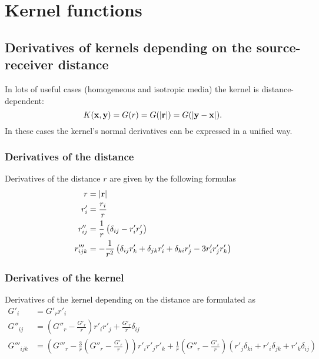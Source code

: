 \chapter{Kernel functions}

\section{Derivatives of kernels depending on the source-receiver distance}

In lots of useful cases (homogeneous and isotropic media) the kernel is distance-dependent:
%
\begin{equation}
K({\bf x}, {\bf y}) = G(r) = G(|{\bf r}|) = G(|{\bf y} - {\bf x}|).
\end{equation}
%
In these cases the kernel's normal derivatives can be expressed in a unified way.

\subsection{Derivatives of the distance}

Derivatives of the distance $r$ are given by the following formulas
%
\begin{align}
	r &= |{\bf r}| \\
	r'_i &= \frac{r_i}{r} \\
	r''_{ij} &= \frac{1}{r} \left( \delta_{ij} - r'_i r'_j \right) \\
	r'''_{ijk} &= -\frac{1}{r^2} \left(
		\delta_{ij} r'_k + \delta_{jk} r'_i + \delta_{ki} r'_j - 3 r'_i r'_j r'_k
	\right)
\end{align}

\subsection{Derivatives of the kernel}

Derivatives of the kernel depending on the distance are formulated as
%
\begin{align}
	G'_i &= G'_r r'_i \\
	G''_{ij} &= \left(G''_r - \frac{G'_r}{r} \right) r'_i r'_j +  \frac{G'_r}{r} \delta_{ij} \\
	G'''_{ijk} &=
	\left(G'''_r -\frac{3}{r} \left(G''_r  - \frac{G'_r}{r} \right) \right) r'_i r'_j r'_k
	+  \frac{1}{r} \left( G''_r  - \frac{G'_r}{r} \right)\left(
	   r'_j \delta_{ki}
	+  r'_i \delta_{jk}
	+  r'_k \delta_{ij}
	\right)
	\label{eq:derivatives_wrt_ij}
\end{align}

